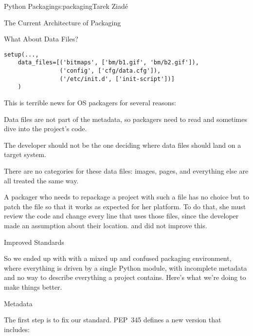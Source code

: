 \begin{aosachapter}{Python Packaging}{s:packaging}{Tarek Ziad\'{e}}
\begin{aosasect1}{The Current Architecture of Packaging}
\begin{aosasect2}{What About Data Files?}
\begin{verbatim}
setup(...,
    data_files=[('bitmaps', ['bm/b1.gif', 'bm/b2.gif']),
                ('config', ['cfg/data.cfg']),
                ('/etc/init.d', ['init-script'])]
    )
\end{verbatim}

\noindent
This is terrible news for OS packagers for several reasons:

\begin{aosaitemize}

  \item Data files are not part of the metadata, so packagers need to read
   and sometimes dive into the project's code.

  \item The developer should not be the one deciding where data files
  should land on a target system.

  \item There are no categories for these data files: images, 
  pages, and everything else are all treated the same way.

\end{aosaitemize}

A packager who needs to repackage a project with such a file has no
choice but to patch the  file so that it works as
expected for her platform.  To do that, she must review the code
and change every line that uses those files, since the developer made
an assumption about their location.   and 
did not improve this.

\end{aosasect2}

\end{aosasect1}

\begin{aosasect1}{Improved Standards}

So we ended up with with a mixed up and confused packaging
environment, where everything is driven by a single Python module,
with incomplete metadata and no way to describe everything a project
contains.  Here's what we're doing to make things better.

\begin{aosasect2}{Metadata}

The first step is to fix our  standard.  PEP~345
defines a new version that includes:

\begin{aosaitemize}


\end{aosaitemize}
\end{aosasect2}
\end{aosasect1}
\end{aosachapter}
